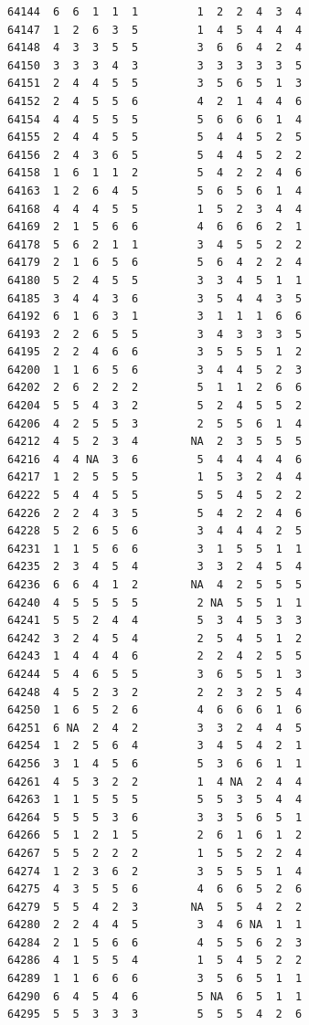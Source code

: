 \documentclass[
  letterpaper,
  DIV=11,
  numbers=noendperiod]{scrreprt}
\begin{document}
\begin{verbatim}
64144  6  6  1  1  1         1  2  2  4  3  4
64147  1  2  6  3  5         1  4  5  4  4  4
64148  4  3  3  5  5         3  6  6  4  2  4
64150  3  3  3  4  3         3  3  3  3  3  5
64151  2  4  4  5  5         3  5  6  5  1  3
64152  2  4  5  5  6         4  2  1  4  4  6
64154  4  4  5  5  5         5  6  6  6  1  4
64155  2  4  4  5  5         5  4  4  5  2  5
64156  2  4  3  6  5         5  4  4  5  2  2
64158  1  6  1  1  2         5  4  2  2  4  6
64163  1  2  6  4  5         5  6  5  6  1  4
64168  4  4  4  5  5         1  5  2  3  4  4
64169  2  1  5  6  6         4  6  6  6  2  1
64178  5  6  2  1  1         3  4  5  5  2  2
64179  2  1  6  5  6         5  6  4  2  2  4
64180  5  2  4  5  5         3  3  4  5  1  1
64185  3  4  4  3  6         3  5  4  4  3  5
64192  6  1  6  3  1         3  1  1  1  6  6
64193  2  2  6  5  5         3  4  3  3  3  5
64195  2  2  4  6  6         3  5  5  5  1  2
64200  1  1  6  5  6         3  4  4  5  2  3
64202  2  6  2  2  2         5  1  1  2  6  6
64204  5  5  4  3  2         5  2  4  5  5  2
64206  4  2  5  5  3         2  5  5  6  1  4
64212  4  5  2  3  4        NA  2  3  5  5  5
64216  4  4 NA  3  6         5  4  4  4  4  6
64217  1  2  5  5  5         1  5  3  2  4  4
64222  5  4  4  5  5         5  5  4  5  2  2
64226  2  2  4  3  5         5  4  2  2  4  6
64228  5  2  6  5  6         3  4  4  4  2  5
64231  1  1  5  6  6         3  1  5  5  1  1
64235  2  3  4  5  4         3  3  2  4  5  4
64236  6  6  4  1  2        NA  4  2  5  5  5
64240  4  5  5  5  5         2 NA  5  5  1  1
64241  5  5  2  4  4         5  3  4  5  3  3
64242  3  2  4  5  4         2  5  4  5  1  2
64243  1  4  4  4  6         2  2  4  2  5  5
64244  5  4  6  5  5         3  6  5  5  1  3
64248  4  5  2  3  2         2  2  3  2  5  4
64250  1  6  5  2  6         4  6  6  6  1  6
64251  6 NA  2  4  2         3  3  2  4  4  5
64254  1  2  5  6  4         3  4  5  4  2  1
64256  3  1  4  5  6         5  3  6  6  1  1
64261  4  5  3  2  2         1  4 NA  2  4  4
64263  1  1  5  5  5         5  5  3  5  4  4
64264  5  5  5  3  6         3  3  5  6  5  1
64266  5  1  2  1  5         2  6  1  6  1  2
64267  5  5  2  2  2         1  5  5  2  2  4
64274  1  2  3  6  2         3  5  5  5  1  4
64275  4  3  5  5  6         4  6  6  5  2  6
64279  5  5  4  2  3        NA  5  5  4  2  2
64280  2  2  4  4  5         3  4  6 NA  1  1
64284  2  1  5  6  6         4  5  5  6  2  3
64286  4  1  5  5  4         1  5  4  5  2  2
64289  1  1  6  6  6         3  5  6  5  1  1
64290  6  4  5  4  6         5 NA  6  5  1  1
64295  5  5  3  3  3         5  5  5  4  2  6

\end{verbatim}
\end{document}
